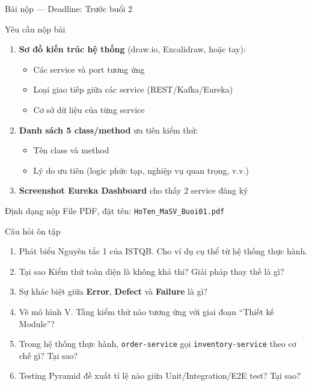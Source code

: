 \documentclass[aspectratio=169,12pt]{beamer}
\begin{document}
\begin{frame}[shrink=10]{Bài nộp --- Deadline: Trước buổi 2}
  \begin{block}{Yêu cầu nộp bài}
    \begin{enumerate}
      \item \textbf{Sơ đồ kiến trúc hệ thống} (draw.io, Excalidraw, hoặc tay):
        \begin{itemize}
          \item Các service và port tương ứng
          \item Loại giao tiếp giữa các service (REST/Kafka/Eureka)
          \item Cơ sở dữ liệu của từng service
        \end{itemize}
      \item \textbf{Danh sách 5 class/method} ưu tiên kiểm thử:
        \begin{itemize}
          \item Tên class và method
          \item Lý do ưu tiên (logic phức tạp, nghiệp vụ quan trọng, v.v.)
        \end{itemize}
      \item \textbf{Screenshot Eureka Dashboard} cho thấy 2 service đăng ký
    \end{enumerate}
  \end{block}

  \begin{alertblock}{Định dạng nộp}
    File PDF, đặt tên: \texttt{HoTen\_MaSV\_Buoi01.pdf}
  \end{alertblock}
\end{frame}

\begin{frame}{Câu hỏi ôn tập}
  \begin{enumerate}
    \item Phát biểu Nguyên tắc 1 của ISTQB. Cho ví dụ cụ thể từ hệ thống thực hành.
    \item Tại sao Kiểm thử toàn diện là không khả thi? Giải pháp thay thế là gì?
    \item Sự khác biệt giữa \textbf{Error}, \textbf{Defect} và \textbf{Failure} là gì?
    \item Vẽ mô hình V. Tầng kiểm thử nào tương ứng với giai đoạn ``Thiết kế Module''?
    \item Trong hệ thống thực hành, \texttt{order-service} gọi \texttt{inventory-service} theo cơ chế gì? Tại sao?
    \item Testing Pyramid đề xuất tỉ lệ nào giữa Unit/Integration/E2E test? Tại sao?
  \end{enumerate}
\end{frame}
\end{document}

